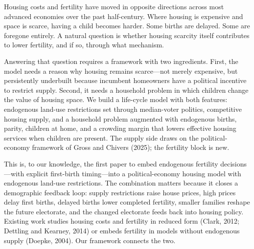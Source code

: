\documentclass[11pt]{article}
\begin{document}
Housing costs and fertility have moved in opposite directions across most advanced economies
over the past half-century. Where housing is expensive and space is scarce, having a child
becomes harder. Some births are delayed. Some are foregone entirely. A natural question is
whether housing scarcity itself contributes to lower fertility, and if so, through what
mechanism.

Answering that question requires a framework with two ingredients. First, the model needs a
reason why housing remains scarce---not merely expensive, but persistently underbuilt because
incumbent homeowners have a political incentive to restrict supply. Second, it needs a
household problem in which children change the value of housing space. We build a life-cycle
model with both features: endogenous land-use restrictions set through median-voter politics,
competitive housing supply, and a household problem augmented with endogenous births, parity,
children at home, and a crowding margin that lowers effective housing services when children
are present. The supply side draws on the political-economy framework of Gross and Chivers
(2025); the fertility block is new.

This is, to our knowledge, the first paper to embed endogenous fertility decisions---with
explicit first-birth timing---into a political-economy housing model with endogenous
land-use restrictions. The combination matters because it closes a demographic feedback loop:
supply restrictions raise house prices, high prices delay first births, delayed births lower
completed fertility, smaller families reshape the future electorate, and the changed
electorate feeds back into housing policy. Existing work studies housing costs and fertility
in reduced form (Clark, 2012; Dettling and Kearney, 2014) or embeds fertility in models
without endogenous supply (Doepke, 2004). Our framework connects the two.
\end{document}
